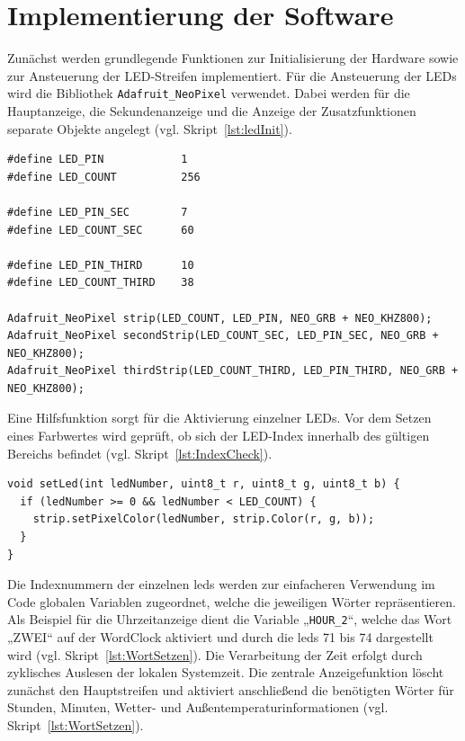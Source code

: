 \section{Implementierung der Software}
Zunächst werden grundlegende Funktionen zur Initialisierung der Hardware sowie zur Ansteuerung der LED-Streifen implementiert.  
Für die Ansteuerung der LEDs wird die Bibliothek \texttt{Adafruit\_NeoPixel} verwendet.  
Dabei werden für die Hauptanzeige, die Sekundenanzeige und die Anzeige der Zusatzfunktionen separate Objekte angelegt (vgl. Skript~\ref{lst:ledInit}).

\begin{lstlisting}[style=arduino,caption={Initialisierung der LED-Stränge.},label={lst:ledInit}]
#define LED_PIN            1
#define LED_COUNT          256

#define LED_PIN_SEC        7
#define LED_COUNT_SEC      60

#define LED_PIN_THIRD      10
#define LED_COUNT_THIRD    38

Adafruit_NeoPixel strip(LED_COUNT, LED_PIN, NEO_GRB + NEO_KHZ800);
Adafruit_NeoPixel secondStrip(LED_COUNT_SEC, LED_PIN_SEC, NEO_GRB + NEO_KHZ800);
Adafruit_NeoPixel thirdStrip(LED_COUNT_THIRD, LED_PIN_THIRD, NEO_GRB + NEO_KHZ800);
\end{lstlisting}

Eine Hilfsfunktion sorgt für die Aktivierung einzelner LEDs.  
Vor dem Setzen eines Farbwertes wird geprüft, ob sich der LED-Index innerhalb des gültigen Bereichs befindet (vgl. Skript~\ref{lst:IndexCheck}).

\begin{lstlisting}[style=arduino,caption={Setzen einer einzelnen LED.},label={lst:IndexCheck}]
void setLed(int ledNumber, uint8_t r, uint8_t g, uint8_t b) {
  if (ledNumber >= 0 && ledNumber < LED_COUNT) {
    strip.setPixelColor(ledNumber, strip.Color(r, g, b));
  }
}
\end{lstlisting}

Die Indexnummern der einzelnen \gls{led}s werden zur einfacheren Verwendung im Code globalen Variablen zugeordnet, welche die jeweiligen Wörter repräsentieren. 
Als Beispiel für die Uhrzeitanzeige dient die Variable „\texttt{HOUR\_2}“, welche das Wort „ZWEI“ auf der WordClock aktiviert und durch die \gls{led}s 71 bis 74 dargestellt wird (vgl. Skript~\ref{lst:WortSetzen}).
Die Verarbeitung der Zeit erfolgt durch zyklisches Auslesen der lokalen Systemzeit.  
Die zentrale Anzeigefunktion löscht zunächst den Hauptstreifen und aktiviert anschließend die benötigten Wörter für Stunden, Minuten, Wetter- und Außentemperaturinformationen (vgl. Skript~\ref{lst:WortSetzen}).

